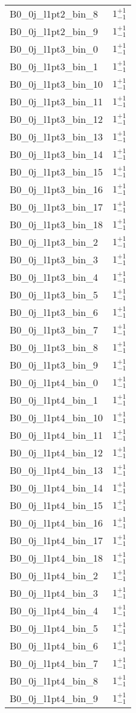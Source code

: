 \begin{tabular}{|l|c|}
B0\_0j\_l1pt2\_bin\_8 & $1^{+1}_{-1}$ \\
B0\_0j\_l1pt2\_bin\_9 & $1^{+1}_{-1}$ \\
B0\_0j\_l1pt3\_bin\_0 & $1^{+1}_{-1}$ \\
B0\_0j\_l1pt3\_bin\_1 & $1^{+1}_{-1}$ \\
B0\_0j\_l1pt3\_bin\_10 & $1^{+1}_{-1}$ \\
B0\_0j\_l1pt3\_bin\_11 & $1^{+1}_{-1}$ \\
B0\_0j\_l1pt3\_bin\_12 & $1^{+1}_{-1}$ \\
B0\_0j\_l1pt3\_bin\_13 & $1^{+1}_{-1}$ \\
B0\_0j\_l1pt3\_bin\_14 & $1^{+1}_{-1}$ \\
B0\_0j\_l1pt3\_bin\_15 & $1^{+1}_{-1}$ \\
B0\_0j\_l1pt3\_bin\_16 & $1^{+1}_{-1}$ \\
B0\_0j\_l1pt3\_bin\_17 & $1^{+1}_{-1}$ \\
B0\_0j\_l1pt3\_bin\_18 & $1^{+1}_{-1}$ \\
B0\_0j\_l1pt3\_bin\_2 & $1^{+1}_{-1}$ \\
B0\_0j\_l1pt3\_bin\_3 & $1^{+1}_{-1}$ \\
B0\_0j\_l1pt3\_bin\_4 & $1^{+1}_{-1}$ \\
B0\_0j\_l1pt3\_bin\_5 & $1^{+1}_{-1}$ \\
B0\_0j\_l1pt3\_bin\_6 & $1^{+1}_{-1}$ \\
B0\_0j\_l1pt3\_bin\_7 & $1^{+1}_{-1}$ \\
B0\_0j\_l1pt3\_bin\_8 & $1^{+1}_{-1}$ \\
B0\_0j\_l1pt3\_bin\_9 & $1^{+1}_{-1}$ \\
B0\_0j\_l1pt4\_bin\_0 & $1^{+1}_{-1}$ \\
B0\_0j\_l1pt4\_bin\_1 & $1^{+1}_{-1}$ \\
B0\_0j\_l1pt4\_bin\_10 & $1^{+1}_{-1}$ \\
B0\_0j\_l1pt4\_bin\_11 & $1^{+1}_{-1}$ \\
B0\_0j\_l1pt4\_bin\_12 & $1^{+1}_{-1}$ \\
B0\_0j\_l1pt4\_bin\_13 & $1^{+1}_{-1}$ \\
B0\_0j\_l1pt4\_bin\_14 & $1^{+1}_{-1}$ \\
B0\_0j\_l1pt4\_bin\_15 & $1^{+1}_{-1}$ \\
B0\_0j\_l1pt4\_bin\_16 & $1^{+1}_{-1}$ \\
B0\_0j\_l1pt4\_bin\_17 & $1^{+1}_{-1}$ \\
B0\_0j\_l1pt4\_bin\_18 & $1^{+1}_{-1}$ \\
B0\_0j\_l1pt4\_bin\_2 & $1^{+1}_{-1}$ \\
B0\_0j\_l1pt4\_bin\_3 & $1^{+1}_{-1}$ \\
B0\_0j\_l1pt4\_bin\_4 & $1^{+1}_{-1}$ \\
B0\_0j\_l1pt4\_bin\_5 & $1^{+1}_{-1}$ \\
B0\_0j\_l1pt4\_bin\_6 & $1^{+1}_{-1}$ \\
B0\_0j\_l1pt4\_bin\_7 & $1^{+1}_{-1}$ \\
B0\_0j\_l1pt4\_bin\_8 & $1^{+1}_{-1}$ \\
B0\_0j\_l1pt4\_bin\_9 & $1^{+1}_{-1}$ \\
\hline
\end{tabular}
